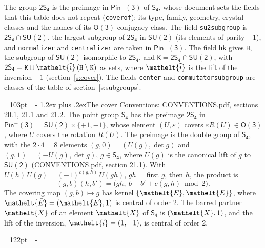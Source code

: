 \documentclass[10pt,a4paper]{article}
\makeatletter
\renewcommand\section{\@startsection{section}{1}{\z@}{-3ex plus -1ex minus -.2ex}%
  {1.2ex plus .2ex}{\normalfont\large\sffamily\bfseries\color{parttitle}}}
\newcommand{\needspace}[1]{\par\penalty-100\begingroup\dimen0=#1\relax\dimen2=\pagegoal
  \advance\dimen2-\pagetotal\ifdim\dimen0>\dimen2\relax\ifdim\dimen2>0pt\vfil\break\fi\fi
  \endgroup}
\numberwithin{equation}{section}
\newcommand{\eltfont}[1]{{\let\sigma\eltsigma\mathelt{#1}}}
\newcommand{\grp}[1]{\mathsf{#1}}
\newcommand{\elt}[1]{\eltfont{#1}}
\newcommand{\dirprod}{\times}
\newcommand{\barred}[1]{\bar{#1}}
\newcommand{\lift}[1]{\tilde{#1}}
\makeatother
\begin{document}
\leavevmode\label{n:element.inversion}\label{n:group.preimage}The group $\grp{2S_{4}}$ is the preimage in $\grp{Pin^{-}(3)}$ of \href{../../../rotation/data/pdf/S4.pdf}{$\grp{S_{4}}$}, whose document sets the fields that this table does not repeat (\texttt{coverof}): its type, family, geometry, crystal classes and the names of its \href{../../../rotation/data/pdf/O3.pdf}{$\grp{O(3)}$}-conjugacy class. The field \texttt{su2subgroup} is $\grp{2S_{4}} \cap \grp{SU(2)}$, the largest subgroup of $\grp{2S_{4}}$ in $\grp{SU(2)}$ (its elements of parity $+1$), and \texttt{normalizer} and \texttt{centralizer} are taken in $\grp{Pin^{-}(3)}$. The field \texttt{hk} gives \texttt{H}, the subgroup of $\grp{SU(2)}$ isomorphic to $\grp{2S_{4}}$, and \texttt{K}${} = \grp{2S_{4}} \cap \grp{SU(2)}$, with $\grp{2S_{4}} = \texttt{K} \cup \elt{\lift{i}}\,(\texttt{H} \setminus \texttt{K})$ as sets, where $\elt{\lift{i}}$ is the lift of the inversion $-1$ (section~\ref{s:cover}). The fields \texttt{center} and \texttt{commutatorsubgroup} are classes of the table of section~\ref{s:subgroups}.
\needspace{103pt}
\section{The cover}\label{s:cover}
Conventions: \href{../../CONVENTIONS.pdf}{CONVENTIONS.pdf}, sections \href{../../CONVENTIONS.pdf\#conv.20.1}{20.1}, \href{../../CONVENTIONS.pdf\#conv.21.1}{21.1} and \href{../../CONVENTIONS.pdf\#conv.21.2}{21.2}.
\leavevmode\label{n:group.pin.minus}\label{n:group.su2}\label{n:local.pin.sign}\label{n:matrix.covered}\label{n:matrix.lift.su2}\label{n:index.bar}The point group $\grp{S_{4}}$ has the preimage $\grp{2S_{4}}$ in $\grp{Pin^{-}(3)} = \grp{SU(2)} \dirprod \{+1, -1\}$, whose element $(U, \varepsilon)$ covers $\varepsilon R(U) \in \grp{O(3)}$, where $U$ covers the rotation $R(U)$. The preimage is the double group of $\grp{S_{4}}$, with the $2 \cdot 4 = 8$ elements $(g, 0) = (U(g), \det g)$ and $(g, 1) = (-U(g), \det g)$, $g \in \grp{S_{4}}$, where $U(g)$ is the canonical lift of $g$ to $\grp{SU(2)}$ (\href{../../CONVENTIONS.pdf}{CONVENTIONS.pdf}, section \href{../../CONVENTIONS.pdf\#conv.21.1}{21.1}). \label{n:function.cocycle}With $U(h)\,U(g) = (-1)^{c(g,h)}\,U(gh)$, $gh$ = first $g$, then $h$, the product is
\begin{equation}\label{e:product}(g, b)(h, b') = \bigl(gh,\ b + b' + c(g, h) \bmod 2\bigr).\end{equation}
\leavevmode\label{n:mark.bar}The covering map $(g, b) \mapsto g$ has kernel $\{\elt{E}, \elt{\barred{E}}\}$, where $\elt{\barred{E}} = (\elt{E}, 1)$ is central of order 2. \label{n:element.named}\label{n:mark.lift}The barred partner $\elt{\barred{X}}$ of an element $\elt{X}$ of $\grp{S_{4}}$ is $(\elt{X}, 1)$, and the lift of the inversion, $\elt{\lift{i}} = (1, -1)$, is central of order 2.
\needspace{122pt}
\end{document}
